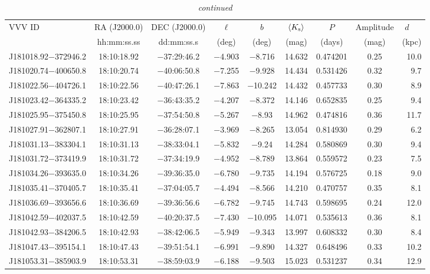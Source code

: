 \begin{table*}
\centering
\caption[]{{\it continued}}
\begin{tabular}{lcccccccr}
\hline \hline
VVV ID & RA (J2000.0)  & DEC (J2000.0) & $\ell$ & $b$ &  $\langle K_{\rm s} \rangle$ & $P$ & Amplitude & $d$~~~ \\
     & hh:mm:ss.ss    & dd:mm:ss.s   &  (deg) & (deg) &   (mag)       & (days) & (mag) & (kpc)   \\
\hline
J181018.92$-$372946.2 & 18:10:18.92 & $-$37:29:46.2 & $-$4.903 & $-$8.716 & 14.632 & 0.474201 & 0.25 & 10.0 \\
J181020.74$-$400650.8 & 18:10:20.74 & $-$40:06:50.8 & $-$7.255 & $-$9.928 & 14.434 & 0.531426 & 0.32 & 9.7 \\
J181022.56$-$404726.1 & 18:10:22.56 & $-$40:47:26.1 & $-$7.863 & $-$10.242 & 14.432 & 0.457733 & 0.30 & 8.9 \\
J181023.42$-$364335.2 & 18:10:23.42 & $-$36:43:35.2 & $-$4.207 & $-$8.372 & 14.146 & 0.652835 & 0.25 & 9.4 \\
J181025.95$-$375450.8 & 18:10:25.95 & $-$37:54:50.8 & $-$5.267 & $-$8.93 & 14.962 & 0.474816 & 0.36 & 11.7 \\
J181027.91$-$362807.1 & 18:10:27.91 & $-$36:28:07.1 & $-$3.969 & $-$8.265 & 13.054 & 0.814930 & 0.29 & 6.2 \\
J181031.13$-$383304.1 & 18:10:31.13 & $-$38:33:04.1 & $-$5.832 & $-$9.24 & 14.284 & 0.580869 & 0.30 & 9.4 \\
J181031.72$-$373419.9 & 18:10:31.72 & $-$37:34:19.9 & $-$4.952 & $-$8.789 & 13.864 & 0.559572 & 0.23 & 7.5 \\
J181034.26$-$393635.0 & 18:10:34.26 & $-$39:36:35.0 & $-$6.780 & $-$9.735 & 14.194 & 0.576725 & 0.18 & 9.0 \\
J181035.41$-$370405.7 & 18:10:35.41 & $-$37:04:05.7 & $-$4.494 & $-$8.566 & 14.210 & 0.470757 & 0.35 & 8.1 \\
J181036.69$-$393656.6 & 18:10:36.69 & $-$39:36:56.6 & $-$6.782 & $-$9.745 & 14.743 & 0.598695 & 0.24 & 12.0 \\
J181042.59$-$402037.5 & 18:10:42.59 & $-$40:20:37.5 & $-$7.430 & $-$10.095 & 14.071 & 0.535613 & 0.36 & 8.1 \\
J181042.93$-$384206.5 & 18:10:42.93 & $-$38:42:06.5 & $-$5.949 & $-$9.343 & 13.997 & 0.608332 & 0.30 & 8.4 \\
J181047.43$-$395154.1 & 18:10:47.43 & $-$39:51:54.1 & $-$6.991 & $-$9.890 & 14.327 & 0.648496 & 0.33 & 10.2 \\
J181053.31$-$385903.9 & 18:10:53.31 & $-$38:59:03.9 & $-$6.188 & $-$9.503 & 15.023 & 0.531237 & 0.34 & 12.9 \\

\end{tabular}
\end{table*}
